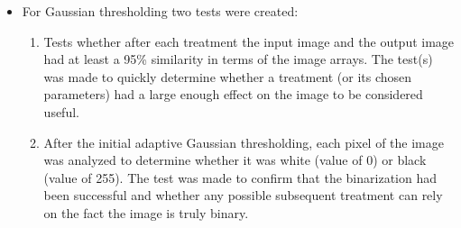 \begin{itemize}
    \item For Gaussian thresholding two tests were created:
    
    \begin{enumerate}
        \item Tests whether after each treatment the input image and the output image had at least a 95\% similarity in terms of the image arrays. The test(s) was made to quickly determine whether a treatment (or its chosen parameters) had a large enough effect on the image to be considered useful.
        \item After the initial adaptive Gaussian thresholding, each pixel of the image was analyzed to determine whether it was white (value of 0) or black (value of 255). The test was made to confirm that the binarization had been successful and whether any possible subsequent treatment can rely on the fact the image is truly binary.
    
    \end{enumerate}
\end{itemize}